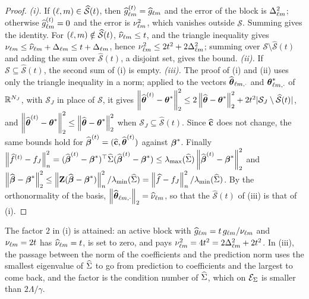 \begin{proof}
\emph{(i).} If $(\ell,m) \in \widehat{\mathcal{S}}(t)$, then
$\widehat{g}^{(t)}_{\ell m} = \widehat{g}_{\ell m}$ and the error of the block
is $\Delta_{\ell m}^{2}$; otherwise $\widehat{g}^{(t)}_{\ell m} = 0$ and the error is
$\nu_{\ell m}^{2}$, which vanishes outside $\mathcal{S}$. Summing gives the
identity. For $(\ell,m) \notin \widehat{\mathcal{S}}(t)$,
$\widehat{\nu}_{\ell m} \le t$, and the triangle inequality gives
$\nu_{\ell m} \le \widehat{\nu}_{\ell m} + \Delta_{\ell m} \le t + \Delta_{\ell m}$, hence
$\nu_{\ell m}^{2} \le 2t^{2} + 2\Delta_{\ell m}^{2}$; summing over
$\mathcal{S}\setminus\widehat{\mathcal{S}}(t)$ and adding the sum over
$\widehat{\mathcal{S}}(t)$, a disjoint set, gives the bound.
\emph{(ii).} If $\mathcal{S} \subseteq \widehat{\mathcal{S}}(t)$, the second sum
of (i) is empty.
\emph{(iii).} The proof of (i) and (ii) uses only the triangle inequality in a
norm; applied to the vectors $\widehat{\boldsymbol{\theta}}_{\ell m,\cdot}$ and
$\boldsymbol{\theta}^{*}_{\ell m,\cdot}$ of $\mathbb{R}^{N_{J}}$, with $\mathcal{S}_J$ in place of
$\mathcal{S}$, it gives $\left\lVert \widehat{\boldsymbol{\theta}}^{(t)}-\boldsymbol{\theta}^{*} \right\rVert_{2}^{2} \le
2\left\lVert \widehat{\boldsymbol{\theta}}-\boldsymbol{\theta}^{*} \right\rVert_{2}^{2} +
2t^{2}|\mathcal{S}_J\setminus\widehat{\mathcal{S}}(t)|$, and
$\left\lVert \widehat{\boldsymbol{\theta}}^{(t)}-\boldsymbol{\theta}^{*} \right\rVert_{2}^{2} \le \left\lVert \widehat{\boldsymbol{\theta}}-\boldsymbol{\theta}^{*} \right\rVert_{2}^{2}$
when $\mathcal{S}_J \subseteq \widehat{\mathcal{S}}(t)$. Since $\widehat{\mathbf{c}}$ does not
change, the same bounds hold for $\widehat{\boldsymbol{\beta}}^{(t)} = (\widehat{\mathbf{c}},\widehat{\boldsymbol{\theta}}^{(t)})$
against $\boldsymbol{\beta}^{*}$. Finally
$\left\lVert \widehat{f}^{(t)}-f_J \right\rVert_{n}^{2} = (\widehat{\boldsymbol{\beta}}^{(t)}-\boldsymbol{\beta}^{*})^{\top}\widehat{\Sigma}
(\widehat{\boldsymbol{\beta}}^{(t)}-\boldsymbol{\beta}^{*}) \le
\lambda_{\max}(\widehat{\Sigma})\left\lVert \widehat{\boldsymbol{\beta}}^{(t)}-\boldsymbol{\beta}^{*} \right\rVert_{2}^{2}$ and
$\left\lVert \widehat{\boldsymbol{\beta}}-\boldsymbol{\beta}^{*} \right\rVert_{2}^{2} \le
\left\lVert \mathbf{Z}(\widehat{\boldsymbol{\beta}}-\boldsymbol{\beta}^{*}) \right\rVert_{n}^{2}/\lambda_{\min}(\widehat{\Sigma}) =
\left\lVert \widehat{f}-f_J \right\rVert_{n}^{2}/\lambda_{\min}(\widehat{\Sigma})$. By the orthonormality of the
basis, $\left\lVert \widehat{\boldsymbol{\theta}}_{\ell m,\cdot} \right\rVert_{2} = \widehat{\nu}_{\ell m}$, so that the
$\widehat{\mathcal{S}}(t)$ of (iii) is that of (i).
\end{proof}

The factor $2$ in (i) is attained: an active block with
$\widehat{g}_{\ell m} = t\,g_{\ell m}/\nu_{\ell m}$ and
$\nu_{\ell m} = 2t$ has $\widehat{\nu}_{\ell m} = t$, is set to zero, and pays
$\nu_{\ell m}^{2} = 4t^{2} = 2\Delta_{\ell m}^{2} + 2t^{2}$. In (iii), the passage between
the norm of the coefficients and the prediction norm uses the smallest
eigenvalue of $\widehat{\Sigma}$ to go from prediction to coefficients and the largest
to come back, and the factor is the condition number of $\widehat{\Sigma}$, which on
$\mathcal{E}_{\Sigma}$ is smaller than $2\Lambda/\gamma$.





